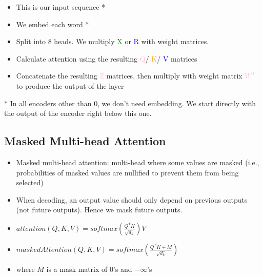 \documentclass{article}
\begin{document}
\begin{minipage}{0.5\textwidth}
\begin{itemize}
    \item This is our input sequence *
    \item We embed each word * \\
    \item Split into 8 heads. We multiply \textcolor{green}{X} or \textcolor{blue}{R} with weight matrices.
    \item Calculate attention using the resulting \textcolor{pink}{Q}/ \textcolor{orange}{K}/ \textcolor{blue}{V} matrices
    \item Concatenate the resulting \textcolor{pink}{Z} matrices, then multiply with weight matrix \textcolor{pink}{$W^0$} to produce the output of the layer
\end{itemize}
\end{minipage}
$\ast$ In all encoders other than 0, we don't need embedding. We start directly with the output of the encoder right below this one.
\subsection{Masked Multi-head Attention}
\begin{itemize}
    \item Masked multi-head attention: multi-head where some values are masked (i.e., probabilities of masked values are nullified to prevent them from being selected)
    \item When decoding, an output value should only depend on previous outputs (not future outputs). Hence we mask future outputs.
    \item $attention(Q,K,V) = softmax(\frac{Q^T K}{\sqrt{d_k}})V$
    \item $maskedAttention(Q,K,V) = softmax(\frac{Q^T K + M}{\sqrt{d_k}})$
    \item where $M$ is a mask matrix of $0$'s and $-\infty$'s
\end{itemize}
\end{document}
